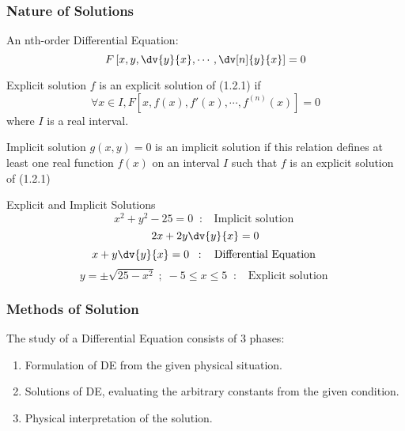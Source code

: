 
\subsubsection{Nature of Solutions}
An nth-order Differential Equation:
\begin{equation}
    F \left[ x, y, \dv{y}{x}, \cdots, \dv[n]{y}{x} \right] = 0
\end{equation}

\begin{definition}{Explicit solution}{}
    $f$ is an explicit solution of (1.2.1) if \[
        \forall x \in I, F \left[ x, f(x), f'(x), \cdots, f^{(n)}(x) \right] = 0
    \] where $I$ is a real interval.
\end{definition}

\begin{definition}{Implicit solution}{}
    $g(x,y)=0$ is an implicit solution if this relation defines at least one real function $f(x)$ on an interval $I$ such that $f$ is an explicit solution of (1.2.1)
\end{definition}

\begin{example}{Explicit and Implicit Solutions}{}
    \[ x^2 + y^2 - 25 = 0 \;\;:\;\; \text{ Implicit solution } \]
    \[ 2x + 2y\dv{y}{x} = 0 \]
    \[ x + y\dv{y}{x} = 0 \;\;:\;\; \text{ Differential Equation } \]
    \[ y = \pm \sqrt{25 - x^2} \;;\; -5 \le x \le 5 \;\;:\;\; \text{ Explicit solution } \]
\end{example}


\subsubsection{Methods of Solution}

The study of a Differential Equation consists of $3$ phases:
\begin{enumerate}
    \item Formulation of DE from the given physical situation.
    \item Solutions of DE, evaluating the arbitrary constants from the given condition.
    \item Physical interpretation of the solution.
\end{enumerate}

